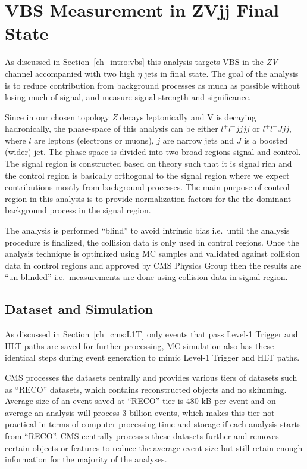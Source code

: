 \chapter{
  VBS Measurement in ZVjj Final State
 }\label{ch_vbs}

As discussed in Section~\ref{ch_intro:vbs} this analysis targets
\gls{VBS} in the \textit{ZV} channel accompanied with two high \( \eta \) jets in final state. The goal of the analysis
is to reduce contribution from background processes as much as possible
without losing much of signal, and measure signal strength and significance.

Since in our chosen topology \textit{Z} decays leptonically and V is decaying hadronically,
the phase-space of this analysis can be either
\( l^+ l^- jjjj \) or \( l^+ l^- J jj\), where \( l \) are leptons (electrons
or muons),
\( j \) are narrow jets and \( J \) is a boosted (wider) jet.
The phase-space is divided into two broad regions signal and control.
The signal region is constructed based on theory such that it is signal rich
and the control region is basically orthogonal to the signal region
where we expect contributions mostly from background processes.
The main purpose of control region
in this analysis is to
provide normalization factors for the the dominant background
process in the signal region.

The analysis is performed ``blind'' to avoid intrinsic bias
i.e.\ until the analysis procedure is finalized, the collision data is only used
in control regions. Once the analysis technique is optimized using \gls{MC}
samples and validated against collision data in control regions and
approved by \gls{CMS} Physics Group
then the results are ``un-blinded'' i.e.\ measurements are done
using collision data in signal region.

\section{
  Dataset and Simulation
 }

As discussed in Section~\ref{ch_cms:L1T} only events that pass Level-1
Trigger and \gls{HLT} paths are saved for further processing, \gls{MC}
simulation also has these identical steps during event generation to mimic
Level-1 Trigger and \gls{HLT} paths.

\gls{CMS} processes the datasets centrally and provides various
tiers of datasets such as ``RECO'' datasets, which contains reconstructed
objects and no skimming. Average size of an event saved at ``RECO'' tier is
480 kB per event and on average an analysis will process
3 billion events, which makes this tier not practical in terms of computer processing
time and storage if each analysis starts from ``RECO''. \gls{CMS} centrally
processes these datasets further and removes certain objects
or features to reduce the average event size but still retain enough information for the
majority of the analyses.


